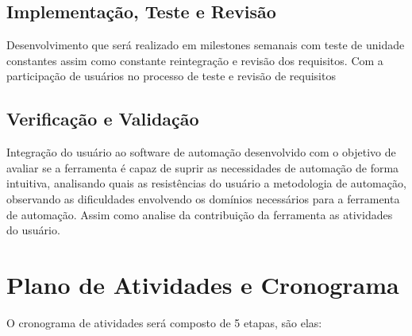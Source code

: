\documentclass[12pt]{article}
\begin{document}
	
	\subsection{Implementação, Teste e Revisão}
	
	Desenvolvimento que será realizado em milestones semanais com teste de unidade constantes assim como constante reintegração e revisão dos requisitos. Com a participação de usuários no processo de teste e revisão de requisitos     
    
    
    \subsection{Verificação e Validação}
    
    Integração do usuário ao software de automação desenvolvido com o objetivo de avaliar se a ferramenta é capaz de suprir as necessidades de automação de forma intuitiva, analisando quais as resistências do usuário a metodologia de automação, observando as dificuldades envolvendo os domínios necessários para a ferramenta de automação. Assim como analise da contribuição da ferramenta as atividades do usuário. 

	\section{Plano de Atividades e Cronograma}
	
	O cronograma de atividades será composto de 5 etapas, são elas:
	
\end{document}
